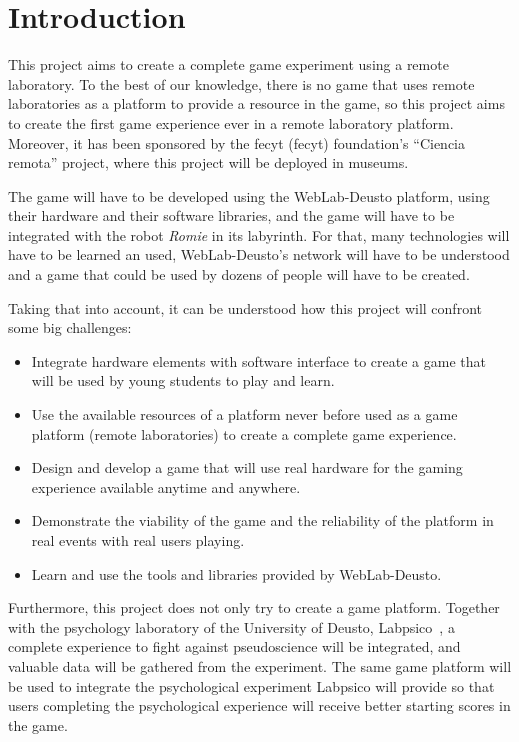 \chapter{Introduction}

This project aims to create a complete game experiment using a remote laboratory. To the best of our
knowledge, there is no game that uses remote laboratories as a platform to provide a resource in the
game, so this project aims to create the first game experience ever in a remote laboratory platform.
Moreover, it has been sponsored by the \acrshort{fecyt} (\acrlong{fecyt}) foundation's ``Ciencia
remota'' project, where this project will be deployed in museums.

The game will have to be developed using the WebLab-Deusto platform, using their hardware and their
software libraries, and the game will have to be integrated with the robot \emph{Romie} in its
labyrinth. For that, many technologies will have to be learned an used, WebLab-Deusto's network will
have to be understood and a game that could be used by dozens of people will have to be created.

Taking that into account, it can be understood how this project will confront some big challenges:

\begin{itemize}

	\item Integrate hardware elements with software interface to create a game that will be used by
	young students to play and learn.

	\item Use the available resources of a platform never before used as a game platform (remote
	laboratories) to create a complete game experience.

	\item Design and develop a game that will use real hardware for the gaming experience available
	anytime and anywhere.

	\item Demonstrate the viability of the game and the reliability of the platform in real events
	with real users playing.

	\item Learn and use the tools and libraries provided by WebLab-Deusto.

\end{itemize}

Furthermore, this project does not only try to create a game platform. Together with the psychology
laboratory of the University of Deusto, Labpsico~\cite{labpsico_web}, a complete experience to fight
against pseudoscience will be integrated, and valuable data will be gathered from the experiment.
The same game platform will be used to integrate the psychological experiment Labpsico will provide
so that users completing the psychological experience will receive better starting scores in the
game.


